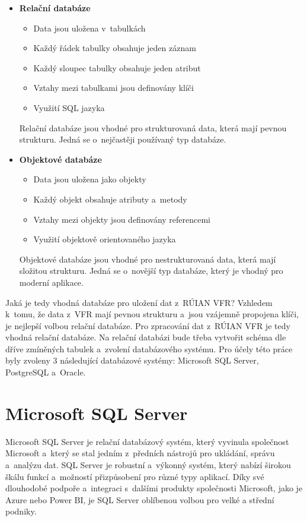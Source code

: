 \documentclass[czech, kiv, ba, he, iso690auyr, pdf]{fasthesis}
\begin{document}
\begin{itemize}
    \item \textbf{Relační databáze}
    \begin{itemize}[itemsep=-1pt]
        \item Data jsou uložena v~tabulkách
        \item Každý řádek tabulky obsahuje jeden záznam
        \item Každý sloupec tabulky obsahuje jeden atribut
        \item Vztahy mezi tabulkami jsou definovány klíči
        \item Využití SQL jazyka
    \end{itemize}
    Relační databáze jsou vhodné pro strukturovaná data, která mají pevnou strukturu.
    Jedná se o~nejčastěji používaný typ databáze.

    \item \textbf{Objektové databáze}
    \begin{itemize}[itemsep=-1pt]
        \item Data jsou uložena jako objekty
        \item Každý objekt obsahuje atributy a~metody
        \item Vztahy mezi objekty jsou definovány referencemi
        \item Využití objektově orientovaného jazyka
    \end{itemize}
    Objektové databáze jsou vhodné pro nestrukturovaná data, která mají složitou strukturu.
    Jedná se o~novější typ databáze, který je vhodný pro moderní aplikace.
\end{itemize}

Jaká je tedy vhodná databáze pro uložení dat z~RÚIAN VFR?
Vzhledem k~tomu, že data z~VFR mají pevnou strukturu a~jsou vzájemně propojena klíči, 
je nejlepší volbou relační databáze. Pro zpracování dat z~RÚIAN VFR je tedy vhodná relační databáze.
Na relační databázi bude třeba vytvořit schéma dle dříve zmíněných tabulek a~zvolení databázového systému.
Pro účely této práce byly zvoleny 3 následující databázové systémy: Microsoft SQL Server, PostgreSQL a~Oracle.

\section{Microsoft SQL Server}
Microsoft SQL Server je relační databázový systém, který vyvinula společnost 
Microsoft a~který se stal jedním z~předních nástrojů pro ukládání, správu a~analýzu dat. 
SQL Server je robustní a~výkonný systém, který nabízí širokou škálu funkcí 
a~možností přizpůsobení pro různé typy aplikací. Díky své dlouhodobé podpoře a~integraci 
s~dalšími produkty společnosti Microsoft, jako je Azure nebo Power BI, je SQL Server 
oblíbenou volbou pro velké a střední podniky.
\end{document}
